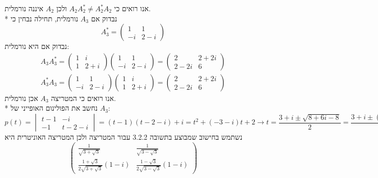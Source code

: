 אנו רואים כי $A_2 A_2^* \ne A_2^* A_2$ ולכן $A_2$ איננה נורמלית. \\*
נבדוק אם $A_3$ נורמלית, תחילה נבחין כי
\[
	A_3^* = \begin{pmatrix}
		1 & 1 \\
		-i & 2 - i
	\end{pmatrix}
\]
נבדוק אם היא נורמלית:
\begin{align*}
	A_3 A_3^* = 
	\begin{pmatrix}
		1 & i \\
		1 & 2 + i
	\end{pmatrix}
	\begin{pmatrix}
		1 & 1 \\
		-i & 2 - i
	\end{pmatrix}
	= \begin{pmatrix}
		2 & 2 + 2i \\
		2 - 2i & 6
	\end{pmatrix} \\
	A_3^* A_3 = 
	\begin{pmatrix}
		1 & 1 \\
		-i & 2 - i
	\end{pmatrix}
	\begin{pmatrix}
		1 & i \\
		1 & 2 + i
	\end{pmatrix}
	= \begin{pmatrix}
		2 & 2 + 2i \\
		2 - 2i & 6
	\end{pmatrix}
\end{align*}
אנו רואים כי המטריצה $A_3$ אכן נורמלית. \\*
נחשב את הפולינום האופייני של $A_3$:
\[
	p(t) = \begin{vmatrix}
		t - 1 & -i \\
		-1 & t - 2 - i
	\end{vmatrix}
	= (t - 1)(t - 2 - i) + i
	= t^2 + (-3 - i)t + 2
	\rightarrow
	t = \frac{3 + i \pm \sqrt{8 + 6i - 8}}{2}
	= \frac{3 + i \pm (\sqrt{3} + \sqrt{3}i)}{2}
\]
נשתמש בחישוב שמבוצע בתשובה 3.2.2 עבור המטריצה ולכן המטריצה האוניטרית היא
\[
	\begin{pmatrix}
		\frac{1}{\sqrt{3 + \sqrt{3}}} & \frac{1}{\sqrt{3 - \sqrt{3}}} \\
		\frac{1 + \sqrt{3}}{2\sqrt{3 + \sqrt{3}}}(1 - i) & \frac{1 - \sqrt{3}}{2\sqrt{3 - \sqrt{3}}}(1 - i)
	\end{pmatrix}
\]

